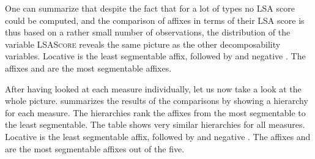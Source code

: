 One can summarize that despite the fact that for a lot of types no LSA score could be computed, and the comparison of affixes in terms of their LSA score is thus based on a rather small number of observations, the distribution of the variable \textsc{LSAScore} reveals the same picture as the other decomposability variables. Locative  is the least segmentable affix, followed by  and negative . The affixes  and  are the most segmentable affixes. 
        
                                                               
After having looked at each  measure individually, let us now take a look at the whole picture.  summarizes the results of the comparisons by showing a  hierarchy for each  measure. The  hierarchies rank the affixes from the most segmentable to the least segmentable. The table shows very similar hierarchies for all measures. Locative  is the least segmentable affix, followed by  and negative . The affixes  and  are the most segmentable affixes out of the five.\largerpage[-1]


